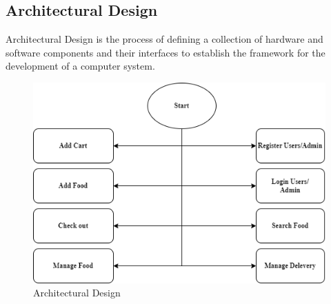 \newpage
\subsection{Architectural Design}
Architectural Design is the process of defining a collection of hardware and software components and their interfaces to establish the framework for the development of a computer system.
\begin{figure}[h]
    \centering
    \includegraphics[scale=0.8]{img/Graphics/ARCHETUREDESIGN.png}
    \caption{Architectural Design}
\end{figure}

\newpage

